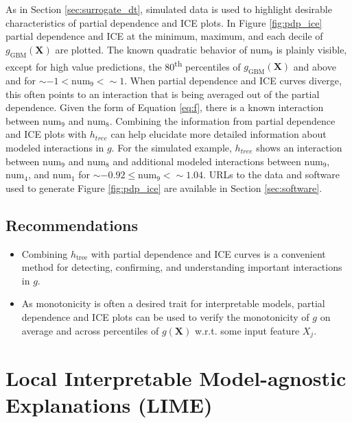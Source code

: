 \documentclass[11pt]{asaproc}
\begin{document}
As in Section \ref{sec:surrogate_dt}, simulated data is used to highlight desirable characteristics of partial dependence and ICE plots. In Figure \ref{fig:pdp_ice} partial dependence and ICE at the minimum, maximum, and each decile of $g_{\text{GBM}}(\mathbf{X})$ are plotted. The known quadratic behavior of $\text{num}_9$ is plainly visible, except for high value predictions, the 80\textsuperscript{th} percentiles of $g_{\text{GBM}}(\mathbf{X})$ and above and for $\sim-1 < \text{num}_9 < \sim1$. When partial dependence and ICE curves diverge, this often points to an interaction that is being averaged out of the partial dependence. Given the form of Equation \ref{eq:f}, there is a known interaction between $\text{num}_9$ and $\text{num}_8$. Combining the information from partial dependence and ICE plots with $h_{tree}$ can help elucidate more detailed information about modeled interactions in $g$. For the simulated example, $h_{tree}$ shows an interaction between $\text{num}_9$ and $\text{num}_8$ and additional modeled interactions between $\text{num}_9$, $\text{num}_4$, and $\text{num}_1$ for $\sim -0.92 \le \text{num}_9 <  \sim 1.04.$ URLs to the data and software used to generate Figure \ref{fig:pdp_ice} are available in Section \ref{sec:software}.

\subsection{Recommendations}

\begin{itemize}

\item Combining $h_{\text{tree}}$ with partial dependence and ICE curves is a convenient method for detecting, confirming, and understanding important interactions in $g$.

\item As monotonicity is often a desired trait for interpretable models, partial dependence and ICE plots can be used to verify the monotonicity of $g$ on average and across percentiles of $g(\mathbf{X})$ w.r.t. some input feature $X_j$.

\end{itemize}

\section{Local Interpretable Model-agnostic Explanations (LIME)}
\label{sec:lime}
\end{document}
